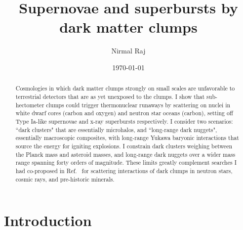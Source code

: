 \documentclass[
    twocolumn,
	prd,
        amssymb,
	preprintnumbers,
	secnumarabic,
	nofootinbib,
	superscriptaddress]{revtex4-1}
\begin{document}
\title{Supernovae and superbursts by dark matter clumps}


\author{Nirmal Raj}


\date{\today}

\begin{abstract}

Cosmologies in which dark matter clumps strongly on small scales are unfavorable to terrestrial detectors that are as yet unexposed to the clumps.
I show that sub-hectometer clumps could trigger thermonuclear runaways by scattering on nuclei in white dwarf cores (carbon and oxygen) and neutron star oceans (carbon), setting off Type Ia-like supernovae and x-ray superbursts respectively.
I consider two scenarios: ``dark clusters" that are essentially microhalos, and ``long-range dark nuggets", essentially macroscopic composites, with long-range Yukawa baryonic interactions that source the energy for igniting explosions.
I constrain dark clusters weighing between the Planck mass and asteroid masses, and long-range dark nuggets over a wider mass range spanning forty orders of magnitude.
These limits greatly complement searches I had co-proposed in Ref.~\cite{NSvIR:clumps2021} for scattering interactions of dark clumps in neutron stars, cosmic rays, and pre-historic minerals.  


\end{abstract}

\maketitle

\section{Introduction}
\end{document}

